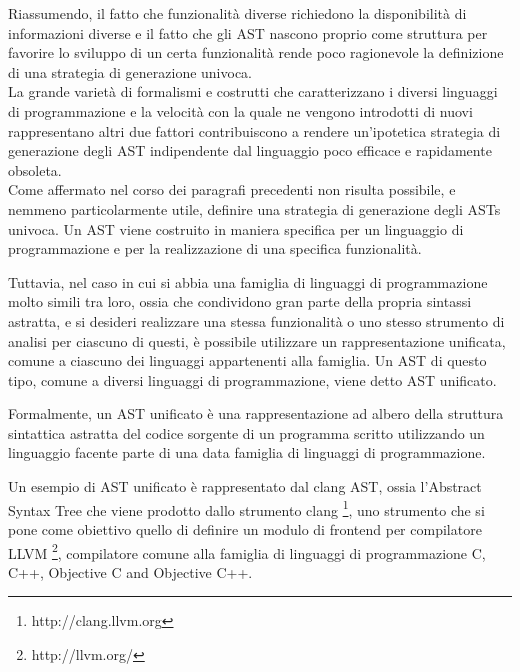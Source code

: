 Riassumendo, il fatto che funzionalità diverse richiedono la disponibilità di
informazioni diverse e il fatto che gli AST nascono proprio come struttura per
favorire lo sviluppo di un certa funzionalità rende poco ragionevole la
definizione di una strategia di generazione univoca.\\

La grande varietà di formalismi e costrutti che caratterizzano i diversi
linguaggi di programmazione e la velocità con la quale ne vengono introdotti di
nuovi rappresentano altri due fattori contribuiscono a rendere un'ipotetica
strategia di generazione degli AST indipendente dal linguaggio poco efficace e
rapidamente obsoleta.\\

Come affermato nel corso dei paragrafi precedenti non risulta possibile, e
nemmeno particolarmente utile, definire una strategia di generazione degli ASTs
univoca. Un AST viene costruito in maniera specifica per un linguaggio di
programmazione e per la realizzazione di una specifica funzionalità.

Tuttavia, nel caso in cui si abbia una famiglia di linguaggi di programmazione
molto simili tra loro, ossia che condividono gran parte della propria sintassi
astratta, e si desideri realizzare una stessa funzionalità o uno stesso
strumento di analisi per ciascuno di questi, è possibile utilizzare un
rappresentazione unificata, comune a ciascuno dei linguaggi appartenenti alla
famiglia. Un AST di questo tipo, comune a diversi linguaggi di programmazione,
viene detto AST unificato.

Formalmente, un AST unificato è una rappresentazione ad albero della struttura
sintattica astratta del codice sorgente di un programma scritto utilizzando un
linguaggio facente parte di una data famiglia di linguaggi di programmazione.

Un esempio di AST unificato è rappresentato dal clang AST, ossia l’Abstract
Syntax Tree che viene prodotto dallo strumento clang \footnote
{http://clang.llvm.org}, uno strumento che si pone come obiettivo quello di
definire un modulo di frontend per compilatore LLVM \footnote{http://llvm.org/},
compilatore comune alla famiglia di linguaggi di programmazione C, C++,
Objective C and Objective C++.\\


